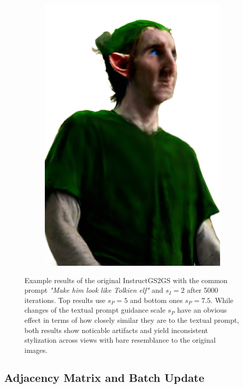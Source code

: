\begin{figure}
\begin{subfigure}{0.18\linewidth}
        \includegraphics[width=\textwidth]{Figures/failed/igs2gs_1/21_render.png}
	\end{subfigure}
    \caption{Example results of the original InstructGS2GS with the common prompt \textit{"Make him look like Tolkien elf"} and $s_I = 2$ after 5000 iterations. Top results use $s_P = 5$ and bottom ones $s_P = 7.5$. While changes of the textual prompt guidance scale $s_P$ have an obvious effect in terms of how closely similar they are to the textual prompt, both results show noticable artifacts and yield inconsistent stylization across views with bare resemblance to the original images.}
    \label{fig:igs2gs_ori_results}

\end{figure}


\subsection{Adjacency Matrix and Batch Update}

